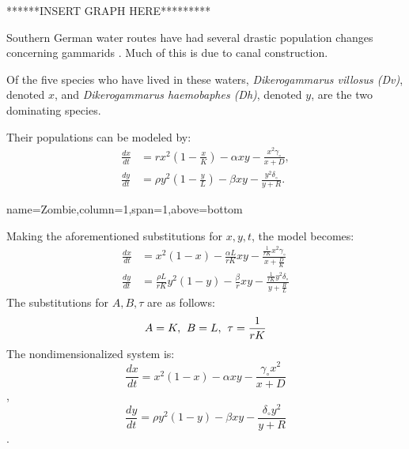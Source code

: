 \documentclass[landscape,final,a0paper,fontscale=0.285]{baposter}
\begin{document}
\begin{poster}
{******INSERT GRAPH HERE*********
}
{
Southern German water routes have had several drastic population
changes concerning gammarids \cite{Dikerogammarus}. Much of this is due to canal construction.

 Of the five species who have lived in these waters, \textit{Dikerogammarus villosus (Dv)}, denoted $x$, and \textit{Dikerogammarus haemobaphes (Dh)}, denoted $y$, are the two dominating species. 

Their populations can be modeled by:
   \begin{align*}
    \frac{dx}{dt} & = rx^2 \left(1-\frac{x}{K}\right) - \alpha xy - \frac{x^2 \gamma_\circ}{x+D}, \\
    \frac{dy}{dt} & = \rho y^2 \left(1-\frac{y}{L}\right) - \beta xy -\frac{y^2 \delta_\circ}{y+R}.
  \end{align*}
	
}


   {name=Zombie,column=1,span=1,above=bottom}{
    
    Making the aforementioned substitutions for $x,y,t$, the model becomes:
        \begin{align*}
            \frac{dx}{dt} & = x^2 (1-x) - \frac{\alpha L}{rK} xy - \frac{\frac{1}{rK}x^2 \gamma_\circ}{x + \frac{D}{K}} \\
            \frac{dy}{dt} & = \frac{\rho L}{rK} y^2 (1-y) - \frac{\beta}{r} xy - \frac{\frac{1}{rK}y^2 \delta_\circ}{y + \frac{R}{L}}
        \end{align*} 
        The substitutions for $A, B, \tau$ are as follows:
        $$A=K, \hspace{.4em} B=L,\hspace{.4em} \tau=\frac{1}{rK}$$ 
        The nondimensionalized system is:
    $$\frac{dx}{dt} = x^2 (1-x) - \alpha xy - \frac{\gamma_\circ x^2}{x+D}$$, 
    $$\frac{dy}{dt} = \rho y^2 (1-y) - \beta xy -\frac{\delta_\circ y^2}{y+R}$$.
 }


\end{poster}
\end{document}
